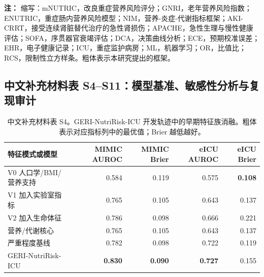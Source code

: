 \documentclass[11pt]{ctexart}
\begin{document}
\begin{table}[htbp]
{\begin{tabular}
\bottomrule
\end{tabular}}
\vspace{0.4em}
\noindent\parbox{\linewidth}{\footnotesize\textbf{注：} 缩写：mNUTRIC，改良重症营养风险评分；GNRI，老年营养风险指数；ENUTRIC，重症肠内营养风险模型；NIM，营养-炎症-代谢指标框架；AKI-CRRT，接受连续肾脏替代治疗的急性肾损伤；APACHE，急性生理与慢性健康评估；SOFA，序贯器官衰竭评估；DCA，决策曲线分析；ECE，预期校准误差；EHR，电子健康记录；ICU，重症监护病房；ML，机器学习；OR，比值比；RCS，限制性立方样条。粗体表示本研究提出的框架。}
\end{table}


\clearpage

\subsection*{中文补充材料表 S4--S11：模型基准、敏感性分析与复现审计}
\label{sec:tab_s4_s10}

\begin{table}[htbp]
\centering
\caption{中文补充材料表 S4。GERI-NutriRisk-ICU 开发轨迹中的早期特征族消融。粗体表示对应指标列中的最优值；Brier 越低越好。}
\label{tab:ablation_s4}
\small
\begin{tabular}{lrrrr}
\toprule
特征模式或模型 & MIMIC AUROC & MIMIC Brier & eICU AUROC & eICU Brier\\
\midrule
V0 人口学/BMI/营养支持 & 0.584 & 0.119 & 0.575 & \textbf{0.108}\\
V1 加入实验室指标 & 0.765 & 0.105 & 0.643 & 0.137\\
V2 加入生命体征 & 0.786 & 0.098 & 0.666 & 0.221\\
营养/代谢核心 & 0.765 & 0.105 & 0.643 & 0.137\\
严重程度基线 & 0.782 & 0.098 & 0.722 & 0.119\\
GERI-NutriRisk-ICU & \textbf{0.830} & \textbf{0.090} & \textbf{0.727} & 0.155\\
\bottomrule
\end{tabular}
\end{table}
\end{document}
